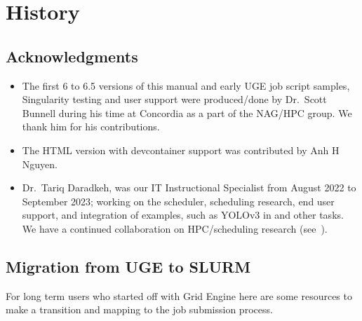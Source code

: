 \documentclass{easychair}
\begin{document}
\section{History}

\subsection{Acknowledgments}
\label{sect:acks}

\begin{itemize}
	\item 
The first 6 to 6.5 versions of this manual and early UGE job script samples,
Singularity testing and user support were produced/done by Dr.~Scott Bunnell
during his time at Concordia as a part of the NAG/HPC group. We thank
him for his contributions.
	\item 
The HTML version with devcontainer support was contributed by Anh H Nguyen.
	\item 
Dr.~Tariq Daradkeh, was our IT Instructional Specialist from August 2022 to September 2023;
working on the scheduler, scheduling research, end user support, and integration of
examples, such as YOLOv3 in  and other tasks. We have a continued
collaboration on HPC/scheduling research (see~\cite{job-failure-prediction-compsysarch2024}).
\end{itemize}

\subsection{Migration from UGE to SLURM}
\label{appdx:uge-to-slurm}

For long term users who started off with Grid Engine here are some resources
to make a transition and mapping to the job submission process.
\end{document}
